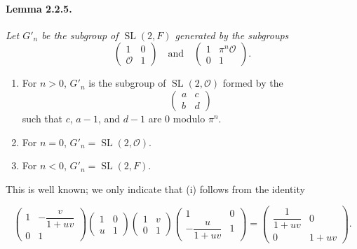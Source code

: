 \documentclass[10pt,a4paper]{article}
\providecommand{\SL}{\operatorname{SL}}
\providecommand{\OO}{\mathcal O}
\begin{document}
\paragraph{Lemma 2.2.5.}{\itshape  Let \(G'_n\) be the subgroup of \(\SL(2,F)\) generated by the subgroups
\[
\begin{pmatrix}1&0\\ \OO&1\end{pmatrix}
\quad\text{and}\quad
\begin{pmatrix}1&\pi^n\OO\\0&1\end{pmatrix}.
\]
\begin{enumerate}[label=(\roman*)]
\item For \(n>0\), \(G'_n\) is the subgroup of \(\SL(2,\OO)\) formed by the
\[
\begin{pmatrix}a&c\\b&d\end{pmatrix}
\]
such that \(c\), \(a-1\), and \(d-1\) are \(0\) modulo \(\pi^n\).
\item For \(n=0\), \(G'_n=\SL(2,\OO)\).
\item For \(n<0\), \(G'_n=\SL(2,F)\).
\end{enumerate}
\par}
This is well known; we only indicate that (i) follows from the identity

\clearpage
{}
\hypertarget{authority-27}{}
\[
\begin{pmatrix}1&-\dfrac{v}{1+uv}\\0&1\end{pmatrix}
\begin{pmatrix}1&0\\u&1\end{pmatrix}
\begin{pmatrix}1&v\\0&1\end{pmatrix}
\begin{pmatrix}1&0\\-\dfrac{u}{1+uv}&1\end{pmatrix}
=
\begin{pmatrix}\dfrac1{1+uv}&0\\0&1+uv\end{pmatrix}.
\]
\end{document}

